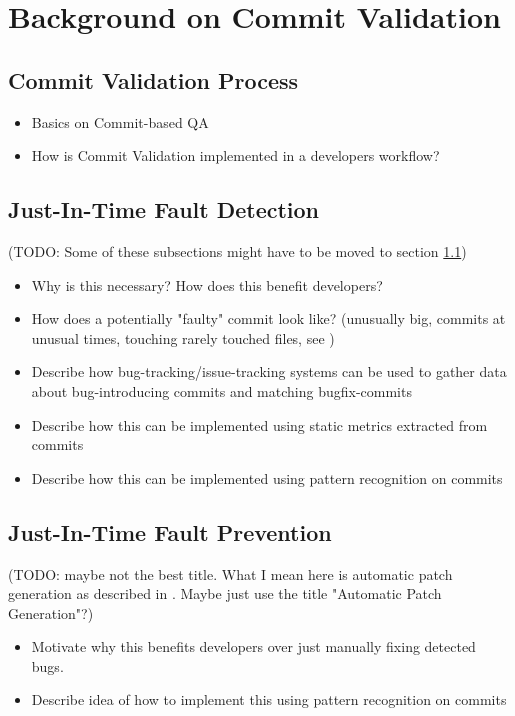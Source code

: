 \section{Background on Commit Validation}

\subsection{Commit Validation Process}
\label{sec:cvprocess}
\begin{itemize}
	\item Basics on Commit-based QA
	\item How is Commit Validation implemented in a developers workflow?
\end{itemize}

\subsection{Just-In-Time Fault Detection}
(TODO: Some of these subsections might have to be moved to section \ref{sec:cvprocess})
\begin{itemize}
	\item Why is this necessary? How does this benefit developers?
	\item How does a potentially "faulty" commit look like? (unusually big, commits at unusual times, touching rarely touched files, see \cite{Goyal2017})
	\item Describe how bug-tracking/issue-tracking systems can be used to gather data about bug-introducing commits and matching bugfix-commits
	\item Describe how this can be implemented using static metrics extracted from commits
	\item Describe how this can be implemented using pattern recognition on commits
\end{itemize}

\subsection{Just-In-Time Fault Prevention}
(TODO: maybe not the best title. What I mean here is automatic patch generation as described in \cite{Nayrolles2018}. Maybe just use the title "Automatic Patch Generation"?)
\begin{itemize}
	\item Motivate why this benefits developers over just manually fixing detected bugs.
	\item Describe idea of how to implement this using pattern recognition on commits
\end{itemize}


